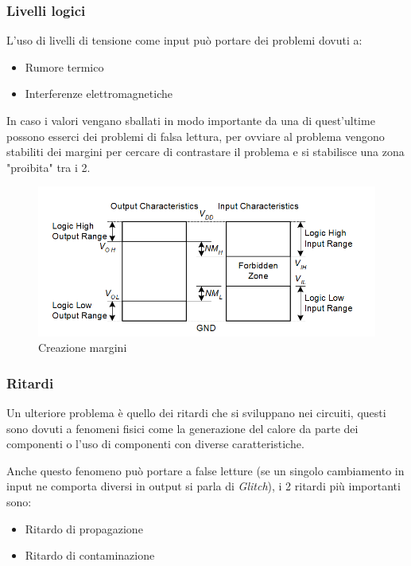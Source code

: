 \documentclass{article}
\begin{document}
\subsubsection{Livelli logici}

L'uso di livelli di tensione come input può portare dei problemi dovuti a: 
\begin{itemize}
    \item Rumore termico
    \item Interferenze elettromagnetiche
\end{itemize} 

In caso i valori vengano sballati in modo importante da una di quest'ultime possono esserci dei problemi di falsa lettura, per ovviare al problema vengono stabiliti dei margini per cercare di contrastare il problema e si stabilisce una zona "proibita" tra i 2.

\begin{figure}[ht]
    \centering
    \includegraphics[width=\linewidth]{margini.png}
    \caption{Creazione margini}
    \label{fig:margini}
\end{figure}

\subsubsection{Ritardi}

Un ulteriore problema è quello dei ritardi che si sviluppano nei circuiti, questi sono dovuti a fenomeni fisici come la generazione del calore da parte dei componenti o l'uso di componenti con diverse caratteristiche.\newline

Anche questo fenomeno può portare a false letture (se un singolo cambiamento in input ne comporta diversi in output si parla di \textit{Glitch}), i 2 ritardi più importanti sono:

\begin{itemize}
    \item Ritardo di propagazione
    \item Ritardo di contaminazione
\end{itemize}
\end{document}
